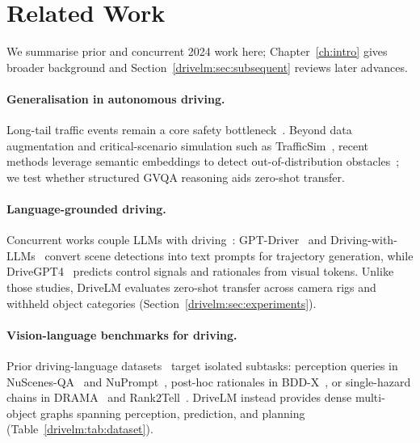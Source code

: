 \section{Related Work}\label{drivelm:sec:related}

We summarise prior and concurrent 2024 work here; Chapter~\ref{ch:intro} gives broader background and Section~\ref{drivelm:sec:subsequent} reviews later advances.

\paragraph{Generalisation in autonomous driving.}
Long-tail traffic events remain a core safety bottleneck~\cite{chen2024e2esurvey,teng2023motion,tampuu2020survey}. Beyond data augmentation and critical-scenario simulation such as TrafficSim~\cite{suo2021trafficsim,chen2022learning,akhauri2020enhanced,wang2021advsim,hanselmann2022king}, recent methods leverage semantic embeddings to detect out-of-distribution obstacles~\cite{elhafsi2023semantic,wang2023driveanywhere,chen2023categorical,pan2024vlp}; we test whether structured GVQA reasoning aids zero-shot transfer.

\paragraph{Language-grounded driving.}
Concurrent works couple LLMs with driving~\cite{seff2023motionlm,mao2023gptdriver,chen2024drivingwithllms,jin2023adapt,xu2024drivegpt4,wayve2023lingo1,wang2023driveanywhere,marcu2024lingoqa,chen2023categorical,wang2023drivemlm,mao2023language,tian2024drivevlm,shao2024lmdrive,yuan2024ragdriver,pan2024vlp,han2024dmedriver}: GPT-Driver~\cite{mao2023gptdriver} and Driving-with-LLMs~\cite{chen2024drivingwithllms} convert scene detections into text prompts for trajectory generation, while DriveGPT4~\cite{xu2024drivegpt4} predicts control signals and rationales from visual tokens. Unlike those studies, DriveLM evaluates zero-shot transfer across camera rigs and withheld object categories (Section~\ref{drivelm:sec:experiments}).

\paragraph{Vision-language benchmarks for driving.}
Prior driving-language datasets~\cite{zhou2023vision,Dewangan2023talk2bev,wu2023referkitti,wu2025nuprompt,qian2024nuscenesqa,kim2019had,kim2018bddx,sachdeva2023rank2tell,malla2023drama,marcu2024lingoqa,ding2024holistic} target isolated subtasks: perception queries in NuScenes-QA~\cite{qian2024nuscenesqa} and NuPrompt~\cite{wu2025nuprompt}, post-hoc rationales in BDD-X~\cite{kim2018bddx}, or single-hazard chains in DRAMA~\cite{malla2023drama} and Rank2Tell~\cite{sachdeva2023rank2tell}. DriveLM instead provides dense multi-object graphs spanning perception, prediction, and planning (Table~\ref{drivelm:tab:dataset}).

